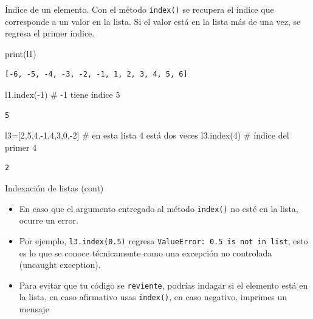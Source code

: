 \documentclass[
  ignorenonframetext,
  aspectratio=169,
  spanish,
]{beamer}
\newenvironment{Shaded}{\begin{snugshade}}{\end{snugshade}}
\newcommand{\BuiltInTok}[1]{\textcolor[rgb]{0.00,0.23,0.31}{#1}}
\newcommand{\CommentTok}[1]{\textcolor[rgb]{0.37,0.37,0.37}{#1}}
\newcommand{\DecValTok}[1]{\textcolor[rgb]{0.68,0.00,0.00}{#1}}
\newcommand{\NormalTok}[1]{\textcolor[rgb]{0.00,0.23,0.31}{#1}}
\newcommand{\OperatorTok}[1]{\textcolor[rgb]{0.37,0.37,0.37}{#1}}
\begin{document}
\begin{frame}[fragile]{Índice de un elemento.}
\label{uxedndice-de-un-elemento.}
Con el método \texttt{index()}  se
recupera el índice que corresponde a un valor en la lista. Si el valor
está en la lista más de una vez, se regresa el primer índice.

\begin{Shaded}
\begin{Highlighting}[]
\BuiltInTok{print}\NormalTok{(l1)}
\end{Highlighting}
\end{Shaded}

\begin{verbatim}
[-6, -5, -4, -3, -2, -1, 1, 2, 3, 4, 5, 6]
\end{verbatim}

\begin{Shaded}
\begin{Highlighting}[]
\NormalTok{l1.index(}\OperatorTok{{-}}\DecValTok{1}\NormalTok{) }\CommentTok{\# {-}1 tiene índice 5 }
\end{Highlighting}
\end{Shaded}

\begin{verbatim}
5
\end{verbatim}

\begin{Shaded}
\begin{Highlighting}[]
\NormalTok{l3}\OperatorTok{=}\NormalTok{[}\DecValTok{2}\NormalTok{,}\DecValTok{5}\NormalTok{,}\DecValTok{4}\NormalTok{,}\OperatorTok{{-}}\DecValTok{1}\NormalTok{,}\DecValTok{4}\NormalTok{,}\DecValTok{3}\NormalTok{,}\DecValTok{0}\NormalTok{,}\OperatorTok{{-}}\DecValTok{2}\NormalTok{] }\CommentTok{\# en esta lista 4 está dos veces }
\NormalTok{l3.index(}\DecValTok{4}\NormalTok{) }\CommentTok{\# índice del primer 4 }
\end{Highlighting}
\end{Shaded}

\begin{verbatim}
2
\end{verbatim}
\end{frame}

\begin{frame}[fragile]{Indexación de listas (cont)}
\label{indexaciuxf3n-de-listas-cont}
\begin{itemize}
\item
  En caso que el argumento entregado al método \texttt{index()} no esté
  en la lista, ocurre un error.
\item
  Por ejemplo, \texttt{l3.index(0.5)} regresa
  \texttt{ValueError:\ 0.5\ is\ not\ in\ list}, esto es lo que se conoce
  técnicamente como una excepción no controlada (uncaught exception).
\item
  Para evitar que tu código se \texttt{reviente}, podrías indagar si el
  elemento está en la lista, en caso afirmativo usas \texttt{index()},
  en caso negativo, imprimes un mensaje
\end{itemize}
\end{frame}
\end{document}
